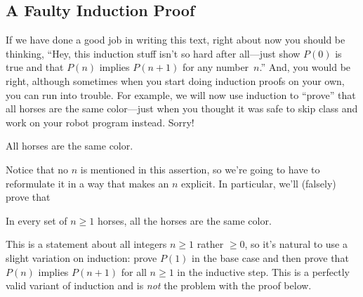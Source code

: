 
\subsection{A Faulty Induction Proof}

If we have done a good job in writing this text, right about now you
should be thinking, ``Hey, this induction stuff isn't so hard after
all---just show $P(0)$ is true and that $P(n)$ implies $P(n+1)$ for
any number~$n$.''  And, you would be right, although sometimes when
you start doing induction proofs on your own, you can run into
trouble.  For example, we will now use induction to ``prove'' that all
horses are the same color---just when you thought it was safe to skip
class and work on your robot program instead.  Sorry!

\begin{falsethm*}
All horses are the same color.
\end{falsethm*}

Notice that no $n$ is mentioned in this assertion, so we're going to have
to reformulate it in a way that makes an $n$ explicit.  In particular,
we'll (falsely) prove that

\begin{falsethm}\label{horses}
In every set of $n \geq 1$ horses, all the horses are the same color.
\end{falsethm}

This is a statement about all integers $n \geq 1$ rather $\geq 0$, so it's
natural to use a slight variation on induction: prove $P(1)$ in the base
case and then prove that $P(n)$ implies $P(n+1)$ for all $n \geq 1$ in the
inductive step.  This is a perfectly valid variant of induction and is
\emph{not} the problem with the proof below.

